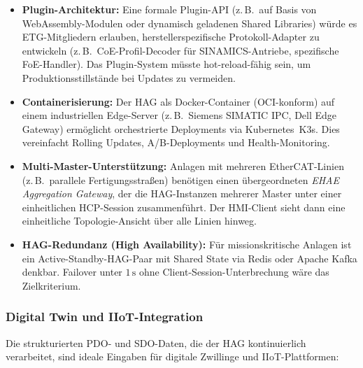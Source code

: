 ﻿\documentclass[12pt,a4paper]{article}
\begin{document}
\begin{itemize}[leftmargin=2em]
  \item \textbf{Plugin-Architektur:} Eine formale Plugin-API (z.\,B.\ auf Basis
    von WebAssembly-Modulen oder dynamisch geladenen Shared Libraries) würde
    es ETG-Mitgliedern erlauben, herstellerspezifische Protokoll-Adapter zu
    entwickeln (z.\,B.\ CoE-Profil-Decoder für SINAMICS-Antriebe, spezifische
    FoE-Handler). Das Plugin-System müsste hot-reload-fähig sein, um
    Produktionsstillstände bei Updates zu vermeiden.
  \item \textbf{Containerisierung:} Der HAG als Docker-Container (OCI-konform)
    auf einem industriellen Edge-Server (z.\,B.\ Siemens SIMATIC IPC, Dell
    Edge Gateway) ermöglicht orchestrierte Deployments via Kubernetes~K3s.
    Dies vereinfacht Rolling Updates, A/B-Deployments und Health-Monitoring.
  \item \textbf{Multi-Master-Unterstützung:} Anlagen mit mehreren EtherCAT-Linien
    (z.\,B.\ parallele Fertigungsstraßen) benötigen einen übergeordneten
    \emph{EHAE Aggregation Gateway}, der die HAG-Instanzen mehrerer Master
    unter einer einheitlichen HCP-Session zusammenführt. Der HMI-Client sieht
    dann eine einheitliche Topologie-Ansicht über alle Linien hinweg.
  \item \textbf{HAG-Redundanz (High Availability):} Für missionskritische Anlagen
    ist ein Active-Standby-HAG-Paar mit Shared State via Redis oder
    Apache Kafka denkbar. Failover unter $1\,\si{\second}$ ohne
    Client-Session-Unterbrechung wäre das Zielkriterium.
\end{itemize}

\subsubsection*{Digital Twin und IIoT-Integration}

Die strukturierten PDO- und SDO-Daten, die der HAG kontinuierlich verarbeitet,
sind ideale Eingaben für digitale Zwillinge und IIoT-Plattformen:
\end{document}
